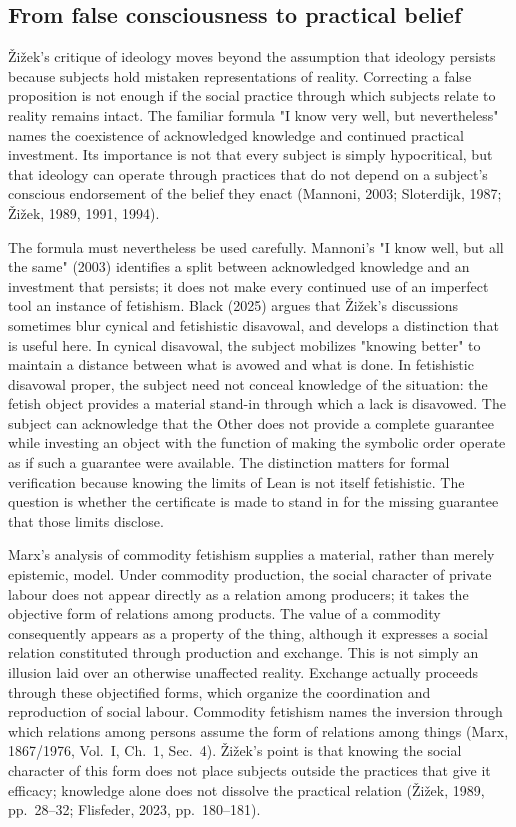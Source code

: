 \documentclass[pdflatex,sn-apa]{sn-jnl}
\begin{document}
\subsection{From false consciousness to practical belief}

Žižek's critique of ideology moves beyond the assumption that ideology persists because subjects hold mistaken representations of reality. Correcting a false proposition is not enough if the social practice through which subjects relate to reality remains intact. The familiar formula "I know very well, but nevertheless" names the coexistence of acknowledged knowledge and continued practical investment. Its importance is not that every subject is simply hypocritical, but that ideology can operate through practices that do not depend on a subject's conscious endorsement of the belief they enact (Mannoni, 2003; Sloterdijk, 1987; Žižek, 1989, 1991, 1994).

The formula must nevertheless be used carefully. Mannoni's "I know well, but all the same" (2003) identifies a split between acknowledged knowledge and an investment that persists; it does not make every continued use of an imperfect tool an instance of fetishism. Black (2025) argues that Žižek's discussions sometimes blur cynical and fetishistic disavowal, and develops a distinction that is useful here. In cynical disavowal, the subject mobilizes "knowing better" to maintain a distance between what is avowed and what is done. In fetishistic disavowal proper, the subject need not conceal knowledge of the situation: the fetish object provides a material stand-in through which a lack is disavowed. The subject can acknowledge that the Other does not provide a complete guarantee while investing an object with the function of making the symbolic order operate as if such a guarantee were available. The distinction matters for formal verification because knowing the limits of Lean is not itself fetishistic. The question is whether the certificate is made to stand in for the missing guarantee that those limits disclose.

Marx's analysis of commodity fetishism supplies a material, rather than merely epistemic, model. Under commodity production, the social character of private labour does not appear directly as a relation among producers; it takes the objective form of relations among products. The value of a commodity consequently appears as a property of the thing, although it expresses a social relation constituted through production and exchange. This is not simply an illusion laid over an otherwise unaffected reality. Exchange actually proceeds through these objectified forms, which organize the coordination and reproduction of social labour. Commodity fetishism names the inversion through which relations among persons assume the form of relations among things (Marx, 1867/1976, Vol.~I, Ch.~1, Sec.~4). Žižek's point is that knowing the social character of this form does not place subjects outside the practices that give it efficacy; knowledge alone does not dissolve the practical relation (Žižek, 1989, pp.~28--32; Flisfeder, 2023, pp.~180--181).
\end{document}
